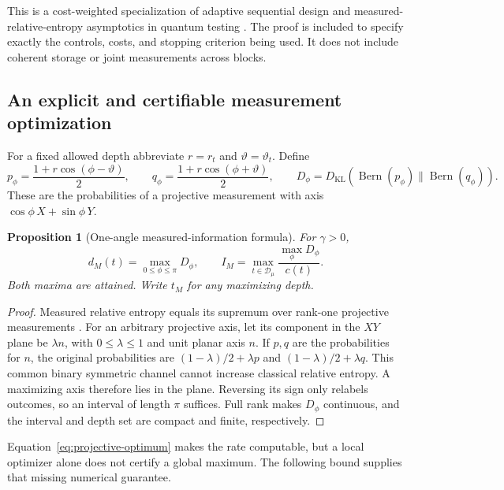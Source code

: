 \documentclass[11pt,a4paper]{article}
\newtheorem{proposition}[theorem]{Proposition}
\theoremstyle{definition}
\theoremstyle{remark}
\numberwithin{equation}{section}
\begin{document}
This is a cost-weighted specialization of adaptive sequential design
\citep{chernoff1959,nitinawarat2015} and measured-relative-entropy
asymptotics in quantum testing \citep{li2022}. The proof is included to
specify exactly the controls, costs, and stopping criterion being used.
It does not include coherent storage or joint measurements across blocks.

\subsection{An explicit and certifiable measurement optimization}
For a fixed allowed depth abbreviate $r=r_t$ and $\vartheta=\vartheta_t$.
Define
\begin{equation}\label{eq:projective-probabilities}
 p_\phi=\frac{1+r\cos(\phi-\vartheta)}2,\qquad
 q_\phi=\frac{1+r\cos(\phi+\vartheta)}2,\qquad
 D_\phi=D_{\mathrm{KL}}(\operatorname{Bern}(p_\phi)\|
                         \operatorname{Bern}(q_\phi)).
\end{equation}
These are the probabilities of a projective measurement with axis
$\cos\phi\,X+\sin\phi\,Y$.

\begin{proposition}[One-angle measured-information formula]\label{prop:projective}
For $\gamma>0$,
\begin{equation}\label{eq:projective-optimum}
 d_M(t)=\max_{0\leq\phi\leq\pi}D_\phi,\qquad
 I_M=\max_{t\in\mathcal D_\mu}\frac{\max_\phi D_\phi}{c(t)}.
\end{equation}
Both maxima are attained. Write $t_M$ for any maximizing depth.
\end{proposition}
\begin{proof}
Measured relative entropy equals its supremum over rank-one projective
measurements \citep[Theorem 2]{berta2017}. For an arbitrary projective
axis, let its component in the $XY$ plane be $\lambda n$, with
$0\leq\lambda\leq1$ and unit planar axis $n$. If $p,q$ are the
probabilities for $n$, the original probabilities are
$(1-\lambda)/2+\lambda p$ and $(1-\lambda)/2+\lambda q$.
This common binary symmetric channel cannot increase classical relative
entropy. A maximizing axis therefore lies in the plane. Reversing its
sign only relabels outcomes, so an interval of length $\pi$ suffices.
Full rank makes $D_\phi$ continuous, and the interval and depth set are
compact and finite, respectively.
\end{proof}

Equation~\eqref{eq:projective-optimum} makes the rate computable, but a
local optimizer alone does not certify a global maximum. The following
bound supplies that missing numerical guarantee.
\end{document}
